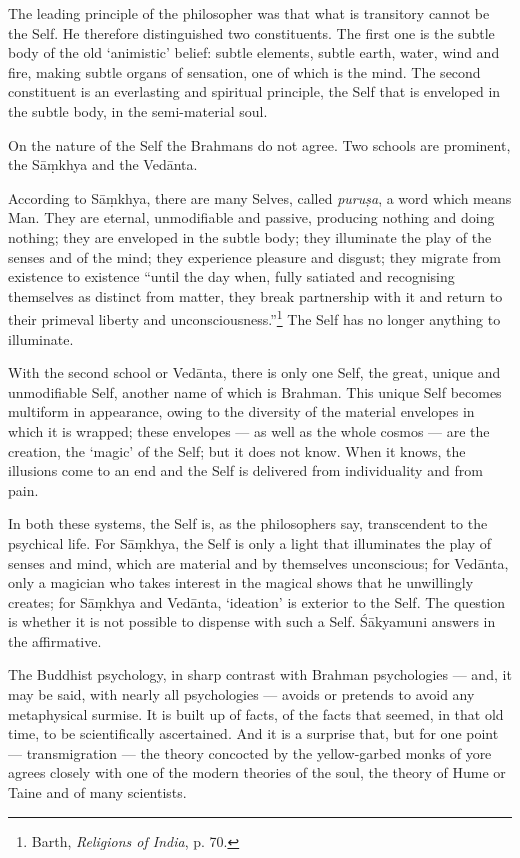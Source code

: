\documentclass[a4paper, 11pt, oneside, english, landscape]{article}
\begin{document}
The leading principle of the philosopher was that what is transitory cannot be the Self. He therefore distinguished two constituents. The first one is the subtle body of the old `animistic' belief: subtle elements, subtle earth, water, wind and fire, making subtle organs of sensation, one of which is the mind. The second constituent is an everlasting and spiritual principle, the Self that is enveloped in the subtle body, in the semi-material soul.

On the nature of the Self the Brahmans do not agree. Two schools are prominent, the Sāṃkhya and the Vedānta.

According to Sāṃkhya, there are many Selves, called \emph{puruṣa}, a word which means Man. They are eternal, unmodifiable and passive, producing nothing and doing nothing; they are enveloped in the subtle body; they illuminate the play of the senses and of the mind; they experience pleasure and disgust; they migrate from existence to existence ``until the day when, fully satiated and recognising themselves as distinct from matter, they break partnership with it and return to their primeval liberty and unconsciousness.''\footnote{Barth, \emph{Religions of India}, p. 70.} The Self has no longer anything to illuminate.

With the second school or Vedānta, there is only one Self, the great, unique and unmodifiable Self, another name of which is Brahman. This unique Self becomes multiform in appearance, owing to the diversity of the material envelopes in which it is wrapped; these envelopes --- as well as the whole cosmos --- are the creation, the `magic' of the Self; but it does not know. When it knows, the illusions come to an end and the Self is delivered from individuality and from pain.

In both these systems, the Self is, as the philosophers say, transcendent to the psychical life. For Sāṃkhya, the Self is only a light that illuminates the play of senses and mind, which are material and by themselves unconscious; for Vedānta, only a magician who takes interest in the magical shows that he unwillingly creates; for Sāṃkhya and Vedānta, `ideation' is exterior to the Self. The question is whether it is not possible to dispense with such a Self. Śākyamuni answers in the affirmative.

The Buddhist psychology, in sharp contrast with Brahman psychologies --- and, it may be said, with nearly all psychologies --- avoids or pretends to avoid any metaphysical surmise. It is built up of facts, of the facts that seemed, in that old time, to be scientifically ascertained. And it is a surprise that, but for one point --- transmigration --- the theory concocted by the yellow-garbed monks of yore agrees closely with one of the modern theories of the soul, the theory of Hume or Taine and of many scientists.
\end{document}

